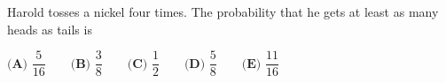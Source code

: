 Harold tosses a nickel four times. The probability that he gets at least as many heads as tails is

$\textbf{(A) } \dfrac5{16}\qquad\textbf{(B) } \dfrac38\qquad\textbf{(C) } \dfrac12\qquad\textbf{(D) } \dfrac58\qquad\textbf{(E) } \dfrac{11}{16}$
